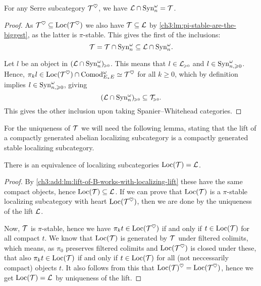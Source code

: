 \begin{lemma}
    \label{ch3:add:lm:lift-of-B-works-with-localizing-lift}
    For any Serre subcategory $\mathcal{T}^\heartsuit$, we have $\mathcal{L}\cap \mathrm{Syn}_{n}^\omega = \mathcal{T}$. 
\end{lemma}
\begin{proof}
    As $\mathcal{T}^\heartsuit \subseteq \operatorname{Loc}(\mathcal{T}^\heartsuit)$ we also have $\mathcal{T} \subseteq \mathcal{L}$ by \cref{ch3:lm:pi-stable-are-the-biggest}, as the latter is $\pi$-stable. This gives the first of the inclusions:
    \[\mathcal{T} = \mathcal{T} \cap \mathrm{Syn}_{n}^\omega\subseteq \mathcal{L} \cap \mathrm{Syn}_{n}^\omega.\]
    
    Let $l$ be an object in $(\mathcal{L}\cap \mathrm{Syn}_{n}^\omega)_{\hspace{-1pt}\scriptscriptstyle\geqslant 0}$. This means that $l\in \mathcal{L}_{\hspace{-1pt}\scriptscriptstyle\geqslant 0}$ and $l \in \mathrm{Syn}_{n, \geqslant 0}^\omega$. Hence, $\pi_k l \in \operatorname{Loc}(\mathcal{T}^\heartsuit)\cap \mathrm{Comod}_{E_*E}^\omega \simeq \mathcal{T}^\heartsuit$ for all $k\geq 0$, which by definition implies $l \in \mathrm{Syn}_{n, \geqslant 0}^\omega$, giving 
    \[(\mathcal{L}\cap \mathrm{Syn}_{n}^\omega)_{\hspace{-1pt}\scriptscriptstyle\geqslant 0} \subseteq \mathcal{T}_{\hspace{-1pt}\scriptscriptstyle\geqslant 0}.\]
    This gives the other inclusion upon taking Spanier--Whitehead categories. 
\end{proof}


For the uniqueness of $\mathcal{T}$ we will need the following lemma, stating that the lift of a compactly generated abelian localizing subcategory is a compactly generated stable localizing subcategory. 

\begin{lemma}
    \label{ch3:add:lm:loc-of-lift-is-localizing-lift}
    There is an equivalence of localizing subcategories $\operatorname{Loc}(\mathcal{T}) = \mathcal{L}$. 
\end{lemma}
\begin{proof}
    By \cref{ch3:add:lm:lift-of-B-works-with-localizing-lift} these have the same compact objects, hence $\operatorname{Loc}(\mathcal{T})\subseteq \mathcal{L}$. If we can prove that $\operatorname{Loc}(\mathcal{T})$ is a $\pi$-stable localizing subcategory with heart $\operatorname{Loc}(\mathcal{T}^\heartsuit)$, then we are done by the uniqueness of the lift $\mathcal{L}$. 

    Now, $\mathcal{T}$ is $\pi$-stable, hence we have $\pi_k t \in \operatorname{Loc}(\mathcal{T}^\heartsuit)$ if and only if $t\in \operatorname{Loc}(\mathcal{T})$ for all compact $t$. We know that $\operatorname{Loc}(\mathcal{T})$ is generated by $\mathcal{T}$ under filtered colimits, which means, as $\pi_0$ preserves filtered colimits and $\operatorname{Loc}(\mathcal{T}^\heartsuit)$ is closed under these, that also $\pi_k t\in \operatorname{Loc}(\mathcal{T})$ if and only if $t\in \operatorname{Loc}(\mathcal{T})$ for all (not neccessarily compact) objects $t$. It also follows from this that $\operatorname{Loc}(\mathcal{T})^\heartsuit = \operatorname{Loc}(\mathcal{T}^\heartsuit)$, hence we get $\operatorname{Loc}(\mathcal{T}) = \mathcal{L}$ by uniqueness of the lift. 
\end{proof}

